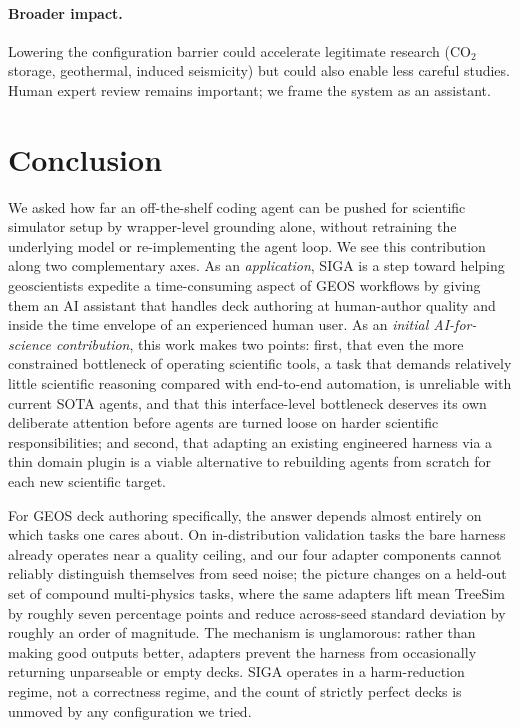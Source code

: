 \documentclass{article}
\begin{document}
\paragraph{Broader impact.} Lowering the configuration barrier could accelerate legitimate research (CO$_2$ storage, geothermal, induced seismicity) but could also enable less careful studies. Human expert review remains important; we frame the system as an assistant.


\section{Conclusion}
\label{sec:conclusion}

We asked how far an off-the-shelf coding agent can be pushed for scientific simulator setup by wrapper-level grounding alone, without retraining the underlying model or re-implementing the agent loop. We see this contribution along two complementary axes. As an \emph{application}, SIGA is a step toward helping geoscientists expedite a time-consuming aspect of GEOS workflows by giving them an AI assistant that handles deck authoring at human-author quality and inside the time envelope of an experienced human user. As an \emph{initial AI-for-science contribution}, this work makes two points: first, that even the more constrained bottleneck of operating scientific tools, a task that demands relatively little scientific reasoning compared with end-to-end automation, is unreliable with current SOTA agents, and that this interface-level bottleneck deserves its own deliberate attention before agents are turned loose on harder scientific responsibilities; and second, that adapting an existing engineered harness via a thin domain plugin is a viable alternative to rebuilding agents from scratch for each new scientific target.

For GEOS deck authoring specifically, the answer depends almost entirely on which tasks one cares about. On in-distribution validation tasks the bare harness already operates near a quality ceiling, and our four adapter components cannot reliably distinguish themselves from seed noise; the picture changes on a held-out set of compound multi-physics tasks, where the same adapters lift mean TreeSim by roughly seven percentage points and reduce across-seed standard deviation by roughly an order of magnitude. The mechanism is unglamorous: rather than making good outputs better, adapters prevent the harness from occasionally returning unparseable or empty decks. SIGA operates in a harm-reduction regime, not a correctness regime, and the count of strictly perfect decks is unmoved by any configuration we tried.
\end{document}
